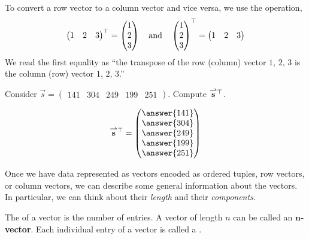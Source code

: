 \documentclass{ximera}
\begin{document}
\begin{definition}
  To convert a row vector to a column vector and vice versa, we use
  the  operation, 
  \[
  \begin{pmatrix} 1 &  2 & 3 \end{pmatrix}^\top =
  \begin{pmatrix} 1 \\ 2 \\ 3 \end{pmatrix}
  \quad\text{and}\quad
  \begin{pmatrix} 1 \\ 2 \\ 3 \end{pmatrix}^\top =
  \begin{pmatrix} 1 &  2 & 3 \end{pmatrix}
  \]
  We read the first equality as ``the transpose of the row (column) vector $1$,
  $2$, $3$ is the column (row) vector $1$, $2$, $3$.'' 
\end{definition}


\begin{question}
  Consider $\vec{s} = \begin{pmatrix}141 & 304 & 249 & 199 & 251 \end{pmatrix}$. Compute ${\overset{\boldsymbol{\rightharpoonup}}{\mathbf{s}}}\hspace{0in}^\top$.
  \begin{prompt}
  \[
  \vec{s}^\transpose  = \begin{pmatrix}\answer{141} \\ \answer{304} \\ \answer{249} \\ \answer{199} \\ \answer{251} \end{pmatrix}
  \]
  \end{prompt}
\end{question}

Once we have data represented as vectors encoded as ordered tuples,
row vectors, or column vectors, we can describe some general
information about the vectors. In particular, we can think about their
\textit{length} and their \textit{components}.

\begin{definition}
The  of a vector is the number of entries.  A vector of
length $n$ can be called an $\boldsymbol n$\textbf{-vector}. Each
individual entry of a vector is called a .
\end{definition}
\end{document}
